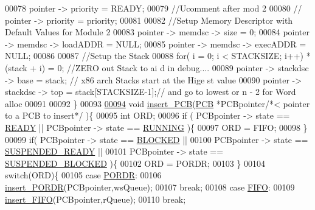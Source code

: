 \begin{DoxyCode}
{      }
00078         pointer -> priority =  READY;
00079         \textcolor{comment}{//Ucomment after mod 2}
00080         \textcolor{comment}{// pointer -> priority = priority;}
00081         
00082         \textcolor{comment}{//Setup Memory Descriptor with Default Values for Module 2}
00083         pointer -> memdsc -> size = 0;
00084         pointer -> memdsc -> loadADDR = NULL;
00085         pointer -> memdsc -> execADDR = NULL;
00086         
00087         \textcolor{comment}{//Setup the Stack}
00088         \textcolor{keywordflow}{for}( i = 0; i < STACKSIZE; i++)  *(stack + i) = 0; \textcolor{comment}{//ZERO out Stack to ai
      d in debug....}
00089         pointer -> stackdsc -> base = stack; \textcolor{comment}{// x86 arch Stacks start at the Hige
      st value }
00090         pointer -> stackdsc -> top  = stack[STACKSIZE-1];\textcolor{comment}{// and go to lowest or n
       - 2 for Word alloc }
00091         
00092 \}
00093 
\hypertarget{mpx__r2_8c_source_l00094}{}\hyperlink{mpx__r2_8h_aa3b334e3a5afd6e590917667ad359a6f}{00094} \textcolor{keywordtype}{void} \hyperlink{mpx__r2_8c_aa3b334e3a5afd6e590917667ad359a6f}{insert_PCB}(\hyperlink{structprocess}{PCB} *PCBpointer\textcolor{comment}{/*< pointer to a PCB to insert*/} )\{ 
00095    \textcolor{keywordtype}{int} ORD;
00096    \textcolor{keywordflow}{if} ( PCBpointer -> state == \hyperlink{mpx__r2_8h_ad1235d5ce36f7267285e82dccd428aa6}{READY} || PCBpointer -> state == \hyperlink{mpx__r2_8h_a6fb7181d994ee98e735494be55809708}{RUNNING} )\{
00097                 ORD  = FIFO;
00098         \}
00099         \textcolor{keywordflow}{if}( PCBpointer -> state == \hyperlink{mpx__r2_8h_a48f6457243719e7031768d4100741159}{BLOCKED} || 
00100                 PCBpointer -> state == \hyperlink{mpx__r2_8h_a07b1141143e8825b04670da23fca8cc7}{SUSPENDED_READY} || 
00101                 PCBpointer -> state == \hyperlink{mpx__r2_8h_a6e41bb5a80c5049e8d364bab8ee4d73a}{SUSPENDED_BLOCKED} )\{
00102                 ORD  = PORDR;
00103         \}
00104    \textcolor{keywordflow}{switch}(ORD)\{
00105                 \textcolor{keywordflow}{case} \hyperlink{mpx__r2_8h_ace032edafb5fe32666cf53a1e7a957e0}{PORDR}:
00106                         \hyperlink{mpx__r2_8c_a722f27bfb24e46ffd7eb86fb34024ed9}{insert_PORDR}(PCBpointer,wsQueue);
00107                         \textcolor{keywordflow}{break};
00108                 \textcolor{keywordflow}{case} \hyperlink{mpx__r2_8h_af6bc2702f6a1a4bb063b0726d90999da}{FIFO}:
00109                         \hyperlink{mpx__r2_8c_a58a3e3525ed6385f632835b55ab7d7d1}{insert_FIFO}(PCBpointer,rQueue);
00110                         \textcolor{keywordflow}{break};

\end{DoxyCode}
